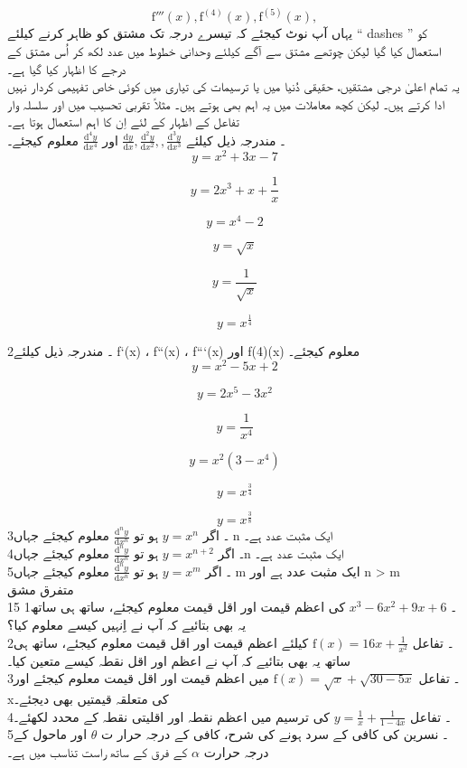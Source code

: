 \[ \text{f}'''(x),\text{f}^{(4)}(x),\text{f}^{(5)}(x),\]	   
	یہاں آپ نوٹ کیجئے کہ تیسرے درجہ تک مشتق کو ظاہر کرنے کیلئے “ dashes  ” کو استعمال کیا گیا لیکن چوتھے مشتق سے آگے کیلئے وحدانی خطوط میں عدد لکھ کر اُس مشتق کے درجے کا اظہار کیا گیا ہے۔ \\
	یہ تمام اعلیٰ درجی مشتقیں، حقیقی دُنیا میں یا ترسیمات کی تیاری میں کوئی خاص  تفہیمی کردار نہیں ادا کرتے ہیں۔ لیکن کچھ معاملات میں یہ اہم بھی ہوتے ہیں۔ مثلاً تقربی تحسیب  میں اور سلسلہ وار تفاعل کے اظہار کے لئے اِن کا اہم استعمال ہوتا ہے۔ \\
۔ مندرجہ ذیل کیلئے 
\(\frac{\text{d}y}{\text{d}x}, \frac{\text{d}^2y}{\text{d}x^2}, , \frac{\text{d}^3y}{\text{d}x^3}\)
  اور 
\(\frac{\text{d}^4y}{\text{d}x^4}\)
   معلوم کیجئے۔ \\
\[y = x^2 + 3x - 7\]

\[y = 2x^3 + x + \frac{1}{x}\]

\[y = x^4 - 2\]

\[y = \sqrt{x}\]

\[y = \frac{1}{\sqrt{x}}\]

\[y = x^{\frac{1}{4}}\]

2۔ مندرجہ ذیل کیلئے  f`(x) ،  f``(x) ،  f```(x) اور f(4)(x)  معلوم کیجئے۔ \\
\[y = x^2 - 5x + 2\]

\[y = 2x^5 - 3x^2\]

\[y = \frac{1}{x^4}\]

\[y = x^2(3 - x^4)\]

\[y = x^{\frac{3}{4}}\]

\[y = x^{\frac{3}{8}}\]
3۔ اگر
\(y = x^n\)
 ہو تو
\(\frac{\text{d}^ny}{\text{d}x^n}\) 
  معلوم کیجئے جہاں n  ایک مثبت عدد ہے۔ \\
4۔ اگر
\(y = x^{n+2}\)
 ہو تو 
\(\frac{\text{d}^ny}{\text{d}x^n}\) 
 معلوم کیجئے جہاںn   ایک مثبت عدد ہے۔\\
5۔ اگر
\(y = x^m\)
ہو تو
\(\frac{\text{d}^ny}{\text{d}x^n}\) 
 معلوم کیجئے جہاں  m  ایک مثبت عدد ہے  اور n > m  \\
متفرق مشق \\15
1۔
\(x^3 - 6x^2 + 9x + 6\)
کی اعظم قیمت اور اقل قیمت معلوم کیجئے، ساتھ ہی ساتھ یہ بھی بتائیے کہ آپ نے اِنہیں کیسے معلوم کیا؟\\
2۔ تفاعل 
\(\text{f}(x) = 16x + \frac{1}{x^2}\)
کیلئے اعظم قیمت اور اقل قیمت معلوم کیجئے، ساتھ ہی ساتھ یہ بھی بتائیے کہ آپ نے اعظم اور اقل نقطہ کیسے متعین کیا۔ \\
3۔ تفاعل
\(\text{f}(x) = \sqrt{x} + \sqrt{30-5x}\)
میں اعظم قیمت اور اقل قیمت معلوم کیجئے اور xکی متعلقہ قیمتیں بھی دیجئے۔ \\
4۔ تفاعل
\(y = \frac{1}{x} + \frac{1}{1-4x}\)
کی ترسیم میں اعظم نقطہ اور اقلیتی نقطہ کے محدد لکھئے۔ \\
5۔ نسرین کی کافی کے سرد ہونے کی شرح،  کافی کے درجہ حرار
ت
\( \theta\)
 اور ماحول کے درجہ حرارت
  \( \alpha\)
 کے فرق کے ساتھ راست تناسب میں ہے۔\\
 
